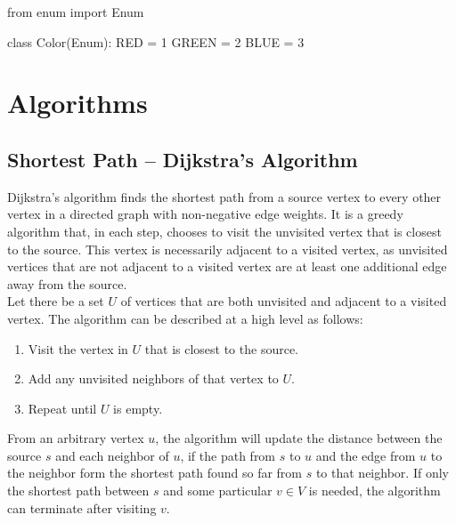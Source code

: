 \documentclass[12pt, titlepage]{article}
\begin{document}
\begin{python}
from enum import Enum

class Color(Enum):
    RED = 1
    GREEN = 2
    BLUE = 3
\end{python}

\newpage
\appendix

\section{Algorithms}

\subsection{Shortest Path -- Dijkstra's Algorithm} \label{dijkstra}

Dijkstra's algorithm finds the shortest path from a source vertex to every other vertex in a directed graph with non-negative edge weights. It is a greedy algorithm that, in each step, chooses to visit the unvisited vertex that is closest to the source. This vertex is necessarily adjacent to a visited vertex, as unvisited vertices that are not adjacent to a visited vertex are at least one additional edge away from the source. \\

Let there be a set $U$ of vertices that are both unvisited and adjacent to a visited vertex. The algorithm can be described at a high level as follows:

\begin{enumerate}
  \item Visit the vertex in $U$ that is closest to the source.
  \item Add any unvisited neighbors of that vertex to $U$.
  \item Repeat until $U$ is empty.
\end{enumerate}

From an arbitrary vertex $u$, the algorithm will update the distance between the source $s$ and each neighbor of $u$, if the path from $s$ to $u$ and the edge from $u$ to the neighbor form the shortest path found so far from $s$ to that neighbor. If only the shortest path between $s$ and some particular $v \in V$ is needed, the algorithm can terminate after visiting $v$. \\
\end{document}
